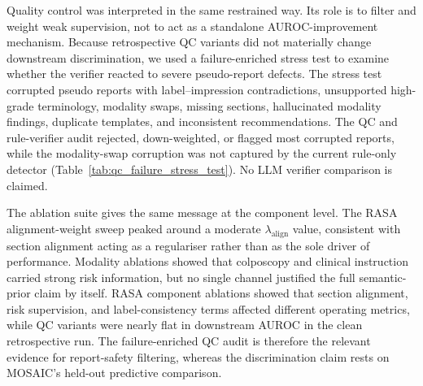 Quality control was interpreted in the same restrained way. Its role is to filter and weight weak supervision, not to act as a standalone AUROC-improvement mechanism. Because retrospective QC variants did not materially change downstream discrimination, we used a failure-enriched stress test to examine whether the verifier reacted to severe pseudo-report defects. The stress test corrupted pseudo reports with label--impression contradictions, unsupported high-grade terminology, modality swaps, missing sections, hallucinated modality findings, duplicate templates, and inconsistent recommendations. The QC and rule-verifier audit rejected, down-weighted, or flagged most corrupted reports, while the modality-swap corruption was not captured by the current rule-only detector (Table~\ref{tab:qc_failure_stress_test}). No LLM verifier comparison is claimed.

The ablation suite gives the same message at the component level. The RASA alignment-weight sweep peaked around a moderate \(\lambda_{\mathrm{align}}\) value, consistent with section alignment acting as a regulariser rather than as the sole driver of performance. Modality ablations showed that colposcopy and clinical instruction carried strong risk information, but no single channel justified the full semantic-prior claim by itself. RASA component ablations showed that section alignment, risk supervision, and label-consistency terms affected different operating metrics, while QC variants were nearly flat in downstream AUROC in the clean retrospective run. The failure-enriched QC audit is therefore the relevant evidence for report-safety filtering, whereas the discrimination claim rests on MOSAIC's held-out predictive comparison.

